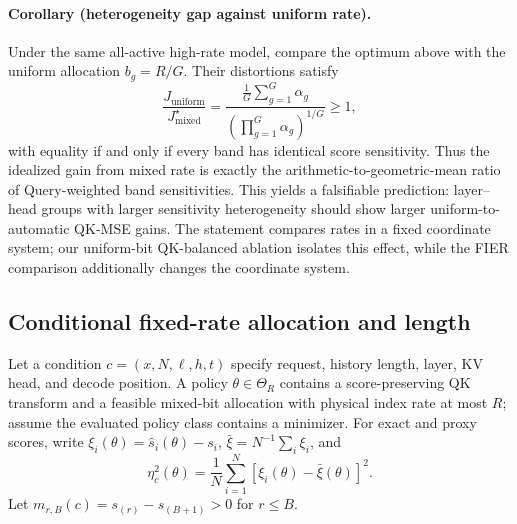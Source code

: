 \paragraph{Corollary (heterogeneity gap against uniform rate).}
Under the same all-active high-rate model, compare the optimum above with
the uniform allocation $b_g=R/G$.  Their distortions satisfy
\begin{equation}
 \frac{J_{\mathrm{uniform}}}{J_{\mathrm{mixed}}^\star}
 =
 \frac{\frac1G\sum_{g=1}^{G}\alpha_g}
      {(\prod_{g=1}^{G}\alpha_g)^{1/G}}
 \ge 1,
 \label{eq:uniform-mixed-ratio}
\end{equation}
with equality if and only if every band has identical score sensitivity.
Thus the idealized gain from mixed rate is exactly the
arithmetic-to-geometric-mean ratio of Query-weighted band sensitivities.
This yields a falsifiable prediction: layer--head groups with larger
sensitivity heterogeneity should show larger uniform-to-automatic QK-MSE
gains.  The statement compares rates in a fixed coordinate system; our
uniform-bit QK-balanced ablation isolates this effect, while the FIER
comparison additionally changes the coordinate system.

\subsection{Conditional fixed-rate allocation and length}

Let a condition
$c=(x,N,\ell,h,t)$ specify request, history length, layer, KV head, and
decode position.  A policy $\theta\in\Theta_R$ contains a score-preserving
QK transform and a feasible mixed-bit allocation with physical index rate
at most $R$; assume the evaluated policy class contains a minimizer.  For
exact and proxy scores, write
$\xi_i(\theta)=\widehat s_i(\theta)-s_i$,
$\bar\xi=N^{-1}\sum_i\xi_i$, and
\begin{equation}
 \eta_c^2(\theta)=
 \frac1N\sum_{i=1}^{N}
 [\xi_i(\theta)-\bar\xi(\theta)]^2 .
\end{equation}
Let $m_{r,B}(c)=s_{(r)}-s_{(B+1)}>0$ for $r\le B$.

